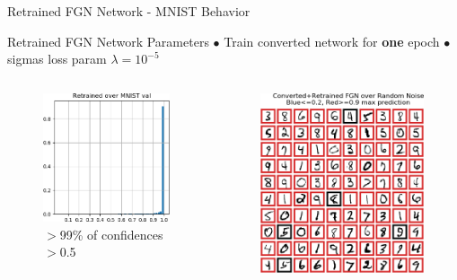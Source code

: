 \documentclass{beamer}
\begin{document}
\begin{frame}{Retrained FGN Network - MNIST Behavior}
    
    \begin{block}{Retrained FGN Network Parameters}
    $\bullet$ Train converted network for \textbf{one} epoch $\bullet$ sigmas loss param $\lambda = 10^{-5}$
    \end{block}

    \begin{columns}
    \begin{column}{.5\textwidth}
    \begin{figure}
        \centering
        \includegraphics[width=.82\textwidth]{images/mnist-behavior/retrained-hist-val.png}
        \caption*{ $>$99\% of confidences $>$0.5}
    \end{figure}
    \end{column}
    \begin{column}{.5\textwidth}
    \begin{figure}
        \raggedright
        \vspace{-3mm}
        \includegraphics[width=.73\textwidth]{images/mnist-behavior/retrained-pred-val.png}

\end{figure}
\end{column}
\end{columns}
\end{frame}
\end{document}
